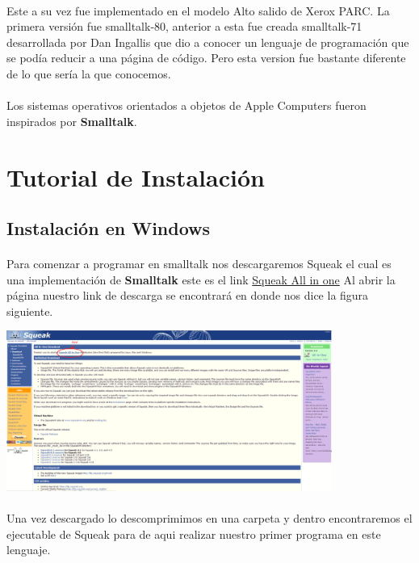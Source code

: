 \documentclass[11pt]{article}
\begin{document}
\paragraph{} \noindent
Este a su vez fue implementado en el modelo Alto salido de Xerox PARC. La primera versión fue smalltalk-80, anterior a esta fue creada smalltalk-71 desarrollada por Dan Ingallis que dio a conocer un lenguaje de programación que se podía reducir a una página de código. Pero esta version fue bastante diferente de lo que sería la que conocemos.
\paragraph{} \noindent
Los sistemas operativos orientados a objetos de Apple Computers fueron inspirados por \textbf{Smalltalk}.
\section{\textbf{Tutorial de Instalación}}
\subsection{\textbf{Instalación en Windows}}
\paragraph{} \noindent
Para comenzar a programar en smalltalk nos descargaremos Squeak el cual es una implementación de \textbf{Smalltalk} este es el link \href{http://www.squeak.org/Download/}{Squeak All in one}
Al abrir la página nuestro link de descarga se encontrará en donde nos dice la figura siguiente.

				\begin{center}
				\includegraphics[width=0.8\textwidth]{images/tutorial}
				\end{center}
\paragraph{} \noindent
Una vez descargado lo descomprimimos en una carpeta y dentro encontraremos el ejecutable de Squeak para de aqui realizar nuestro primer programa en este lenguaje.
\end{document}
